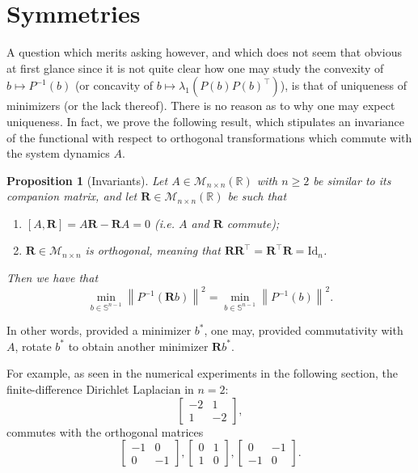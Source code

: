 \documentclass[journal,twoside,web]{ieeecolor}
\newcommand{\R}{\mathbb{R}}
\newtheorem{proposition}{Proposition}
\def\*#1{\mathbf{#1}}
\begin{document}
	\section{Symmetries}
	
	A question which merits asking however, and which does not seem that obvious at first glance since it is not quite clear how one may study the convexity of $b\longmapsto P^{-1}(b)$ (or concavity of $b\longmapsto\lambda_1\left(P(b)P(b)^\top\right)$), is that of uniqueness of minimizers (or the lack thereof). 
	There is no reason as to why one may expect uniqueness. In fact, we prove the following result, which stipulates an invariance of the functional with respect to orthogonal transformations which commute with the system dynamics $A$. 
	\medskip
	
	\begin{proposition}[Invariants] \label{prop: invariants}
	Let $A\in\mathcal{M}_{n\times n}(\R)$ with $n\geqslant2$ be similar to its companion matrix, and let $\*R\in \mathcal{M}_{n\times n}(\R)$ be such that 
	\begin{enumerate}
	\item $[A, \*R]=A\*R-\*RA=0$ (i.e. $A$ and $\*R$ commute);
	\item $\*R\in \mathcal{M}_{n\times n}$ is orthogonal, meaning that $\*R\*R^\top=\*R^\top \*R=\mathrm{Id}_n$.
	\end{enumerate}
	Then we have that
	\begin{equation}
	\min_{b\in\mathbb{S}^{n-1}}\left\|P^{-1}(\*Rb)\right\|^2 = \min_{b\in\mathbb{S}^{n-1}}\left\|P^{-1}(b)\right\|^2.
	\end{equation}
	\end{proposition}	
	\medskip
	
	\noindent
	In other words, provided a minimizer $b^*$, one may, provided commutativity with $A$, rotate $b^*$ to obtain another minimizer $\*Rb^*$.
	
	For example, as seen in the numerical experiments in the following section, the finite-difference Dirichlet Laplacian in $n=2$:
	\begin{equation*}
	\begin{bmatrix}
	-2 & 1\\
	1 & -2
	\end{bmatrix},
	\end{equation*}
	commutes with the orthogonal matrices
	\begin{equation*}
	\begin{bmatrix}-1&0\\0&-1\end{bmatrix}, \begin{bmatrix}0&1\\1&0\end{bmatrix}, \begin{bmatrix}0&-1\\-1&0\end{bmatrix}.
	\end{equation*}
	
\end{document}
